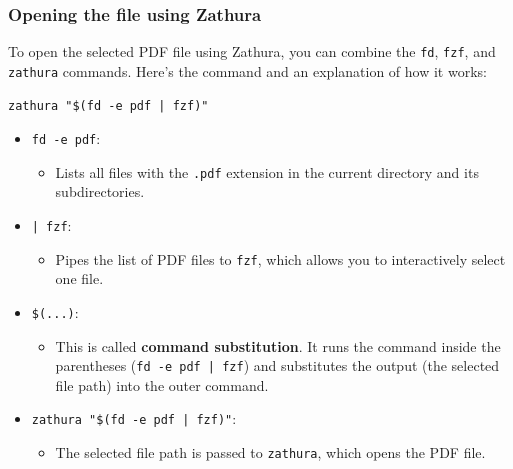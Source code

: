 \documentclass{article}
\newcounter{subsubsubsection}[subsubsection]
\begin{document}
\subsubsection{Opening the file using Zathura}

To open the selected PDF file using Zathura, you can combine the \texttt{fd}, \texttt{fzf}, and \texttt{zathura} commands. Here's the command and an explanation of how it works:

\begin{verbatim}
zathura "$(fd -e pdf | fzf)"
\end{verbatim}


\begin{itemize}
    \item \texttt{fd -e pdf}:
    \begin{itemize}
        \item Lists all files with the \texttt{.pdf} extension in the current directory and its subdirectories.
    \end{itemize}
    
    \item \texttt{| fzf}:
    \begin{itemize}
        \item Pipes the list of PDF files to \texttt{fzf}, which allows you to interactively select one file.
    \end{itemize}
    
    \item \texttt{\$(...)}:
    \begin{itemize}
        \item This is called \textbf{command substitution}. It runs the command inside the parentheses (\texttt{fd -e pdf | fzf}) and substitutes the output (the selected file path) into the outer command.
    \end{itemize}
    
    \item \texttt{zathura "\$(fd -e pdf | fzf)"}:
    \begin{itemize}
        \item The selected file path is passed to \texttt{zathura}, which opens the PDF file.
    \end{itemize}
\end{itemize}
\end{document}
